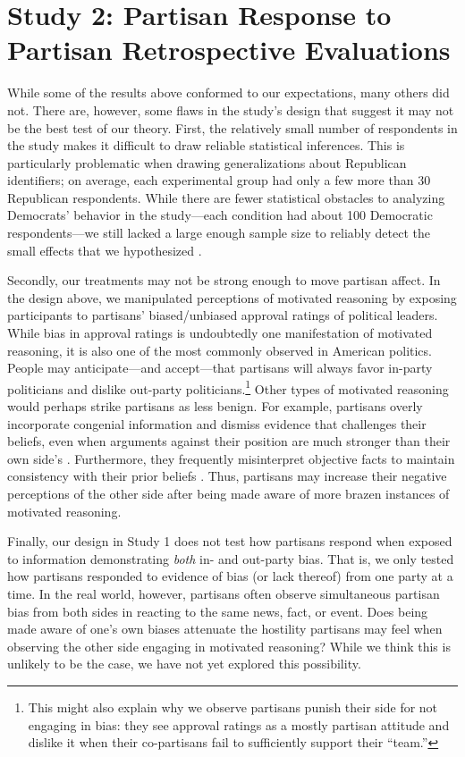 \documentclass[12pt, letterpaper]{article}
\begin{document}
\section*{Study 2: Partisan Response to Partisan Retrospective Evaluations}

While some of the results above conformed to our expectations, many others did not. There are, however, some flaws in the study's design that suggest it may not be the best test of our theory. First, the relatively small number of respondents in the study makes it difficult to draw reliable statistical inferences. This is particularly problematic when drawing generalizations about Republican identifiers; on average, each experimental group had only a few more than 30 Republican respondents. While there are fewer statistical obstacles to analyzing Democrats' behavior in the study---each condition had about 100 Democratic respondents---we still lacked a large enough sample size to reliably detect the small effects that we hypothesized \citep{cohen_1992}. 

Secondly, our treatments may not be strong enough to move partisan affect. In the design above, we manipulated perceptions of motivated reasoning by exposing participants to partisans' biased/unbiased approval ratings of political leaders. While bias in approval ratings is undoubtedly one manifestation of motivated reasoning, it is also one of the most commonly observed in American politics. People may anticipate---and accept---that partisans will always favor in-party politicians and dislike out-party politicians.\footnote{This might also explain why we observe partisans punish their side for not engaging in bias: they see approval ratings as a mostly partisan attitude and dislike it when their co-partisans fail to sufficiently support their ``team.''} Other types of motivated reasoning would perhaps strike partisans as less benign. For example, partisans overly incorporate congenial information and dismiss evidence that challenges their beliefs, even when arguments against their position are much stronger than their own side's \citep{druckmanetal_2013,taber2006}. Furthermore, they frequently misinterpret objective facts to maintain consistency with their prior beliefs \citep{bartels_2002,gainesetal_2007}. Thus, partisans may increase their negative perceptions of the other side after being made aware of more brazen instances of motivated reasoning. 

Finally, our design in Study 1 does not test how partisans respond when exposed to information demonstrating \textit{both} in- and out-party bias. That is, we only tested how partisans responded to evidence of bias (or lack thereof) from one party at a time. In the real world, however, partisans often observe simultaneous partisan bias from both sides in reacting to the same news, fact, or event. Does being made aware of one's own biases attenuate the hostility partisans may feel when observing the other side engaging in motivated reasoning? While we think this is unlikely to be the case, we have not yet explored this possibility. 
\end{document}
